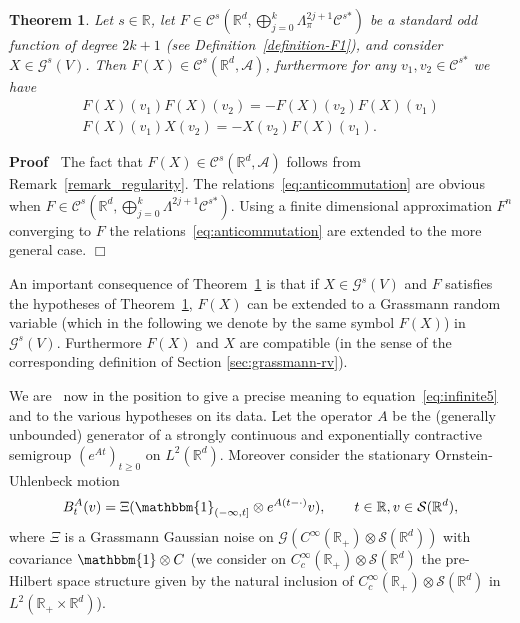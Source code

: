 \documentclass{article}
\newcommand{\asterisk}{\mathord{*}}
\newenvironment{proof}{\noindent\textbf{Proof\ }}{\hspace*{\fill}$\Box$\medskip}
\newtheorem{theorem}{Theorem}
\begin{document}
\begin{theorem}
  \label{theorem_F}Let $s \in \mathbb{R}$, let $F \in \mathcal{C}^s \left(
  \mathbb{R}^d, \bigoplus_{j = 0}^k \Lambda^{2 j + 1}_{\pi} \mathcal{C}^{s
  \asterisk} \right)$ be a standard odd function of degree $2 k + 1$ (see
  Definition~\ref{definition-F1}), and consider $X \in \mathcal{G}^s (V)$.
  Then $F (X) \in \mathcal{C}^s (\mathbb{R}^d, \mathcal{A})$, furthermore for
  any $v_1, v_2 \in \mathcal{C}^{s \asterisk}$ we have
  \begin{equation}
    \begin{array}{c}
      F (X) (v_1) F (X) (v_2) = - F (X) (v_2) F (X) (v_1)\\
      F (X) (v_1) X (v_2) = - X (v_2) F (X) (v_1) .
    \end{array} \label{eq:anticommutation}
  \end{equation}
\end{theorem}

\begin{proof}
  The fact that $F (X) \in \mathcal{C}^s (\mathbb{R}^d, \mathcal{A})$ follows
  from Remark~\ref{remark_regularity}. The
  relations~{\eqref{eq:anticommutation}} are obvious when $F \in \mathcal{C}^s
  \left( \mathbb{R}^d, \bigoplus_{j = 0}^k \Lambda^{2 j + 1} \mathcal{C}^{s
  \asterisk} \right)$. Using a finite dimensional approximation $F^n$
  converging to $F$ the relations~{\eqref{eq:anticommutation}} are extended to
  the more general case.
\end{proof}

\begin{remark}
  An important consequence of Theorem~\ref{theorem_F} is that if $X \in
  \mathcal{G}^s (V)$ and $F$ satisfies the hypotheses of
  Theorem~\ref{theorem_F}, $F (X)$ can be extended to a Grassmann random
  variable (which in the following we denote by the same symbol $F (X)$) in
  $\mathcal{G}^s (V)$. Furthermore $F (X)$ and $X$ are compatible (in the
  sense of the corresponding definition of Section \ref{sec:grassmann-rv}).
\end{remark}

We are \ now in the position to give a precise meaning to
equation~{\eqref{eq:infinite5}} and to the various hypotheses on its data. Let
the operator $A$ be the (generally unbounded) generator of a strongly
continuous and exponentially contractive semigroup $(e^{A t})_{t \geqslant 0}$
on $L^2 (\mathbb{R}^d)$. Moreover consider the stationary Ornstein-Uhlenbeck
motion
\begin{equation}
  B^A_t (v) = \Xi (\mathbbm{1}_{(- \infty, t]} \otimes e^{A (t - \cdot)} v),
  \qquad t \in \mathbb{R}, v \in \mathcal{S} (\mathbb{R}^d), \label{eq:ba}
\end{equation}
where $\Xi$ is a Grassmann Gaussian noise on $\mathcal{G} (C^{\infty}
(\mathbb{R}_+) \otimes \mathcal{S} (\mathbb{R}^d))$ with covariance
$\mathbbm{1} \otimes C$ (we consider on $C^{\infty}_c (\mathbb{R}_+) \otimes
\mathcal{S} (\mathbb{R}^d)$ the pre-Hilbert space structure given by the
natural inclusion of $C^{\infty}_c (\mathbb{R}_+) \otimes \mathcal{S}
(\mathbb{R}^d)$ in $L^2 (\mathbb{R}_+ \times \mathbb{R}^d)$).
\end{document}
